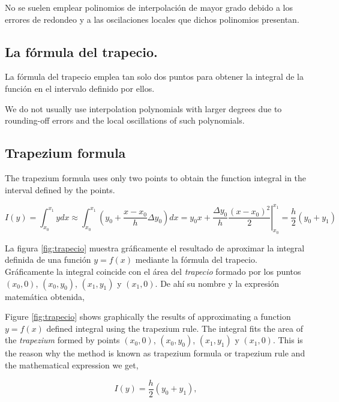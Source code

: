 \begin{paracol}{2}
No se suelen emplear polinomios de interpolación de mayor grado debido a los errores de redondeo y a las oscilaciones locales que dichos polinomios presentan.
 
\subsection{La fórmula del trapecio.}

La fórmula del trapecio emplea tan solo dos puntos para obtener la integral de la función en el intervalo definido por ellos. 

\switchcolumn
We do not usually use interpolation polynomials with larger degrees due to rounding-off errors and the local oscillations of such polynomials.

\subsection{ Trapezium formula}

The trapezium formula uses only two points to obtain the function integral in the interval defined by the points. 
\end{paracol}
\begin{equation*}
I(y)=\int_{x_0}^{x_1}ydx \approx \int_{x_0}^{x_1}\left(y_0+\frac{x-x_0}{h}\Delta y_0\right)dx =y_0x+\left. \frac{\Delta y_0}{h}\frac{(x-x_0)^2}{2} \right\rvert_{x_0}^{x_1}=\frac{h}{2}(y_0+y_1)
\end{equation*}
\begin{paracol}{2}
La figura \ref{fig:trapecio} muestra gráficamente el resultado de aproximar la integral definida de una función $y=f(x)$ mediante la fórmula del trapecio. Gráficamente la integral coincide con el área del \emph{trapecio} formado por los puntos $(x_0,0)$, $(x_0,y_0)$, $(x_1,y_1)$ y $(x_1,0)$.  De ahí su nombre y la expresión matemática obtenida,

\switchcolumn
Figure \ref{fig:trapecio} shows graphically the results of approximating a function $y = f(x)$ defined integral using the trapezium rule. The integral fits the area of the \emph{trapezium} formed by points $(x_0,0)$, $(x_0,y_0)$, $(x_1,y_1)$ y $(x_1,0)$. This is the reason why the method is known as trapezium formula or trapezium rule and the mathematical expression we get,
\end{paracol}
\begin{equation*}
I(y)=\frac{h}{2}(y_0+y_1),
\end{equation*}
